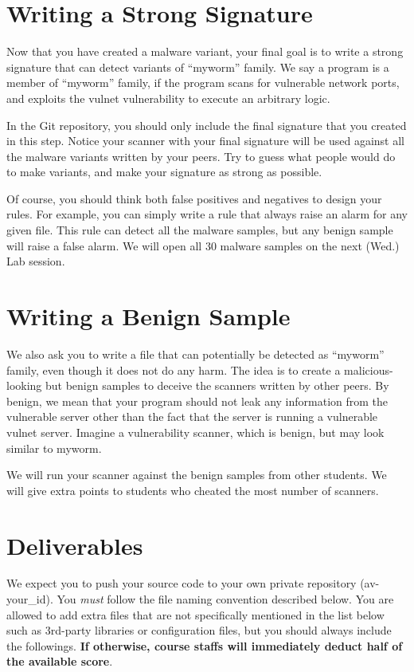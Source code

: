 \documentclass[a4paper, 11pt]{article}
\theoremstyle{definition}
\begin{document}
{\section{Writing a Strong Signature}

Now that you have created a malware variant, your final goal is to
write a strong signature that can detect variants of ``myworm''
family. We say a program is a member of ``myworm'' family, if the
program scans for vulnerable network ports, and exploits the vulnet
vulnerability to execute an arbitrary logic.

In the Git repository, you should only include the final signature
that you created in this step. Notice your scanner with your final
signature will be used against all the malware variants written by
your peers. Try to guess what people would do to make variants, and
make your signature as strong as possible.

Of course, you should think both false positives and negatives to
design your rules. For example, you can simply write a rule that
always raise an alarm for any given file. This rule can detect all the
malware samples, but any benign sample will raise a false alarm. We
will open all 30 malware samples on the next (Wed.) Lab session.

\section{Writing a Benign Sample}

We also ask you to write a file that can potentially be detected as
``myworm'' family, even though it does not do any harm. The idea is to
create a malicious-looking but benign samples to deceive the scanners
written by other peers. By benign, we mean that your program should
not leak any information from the vulnerable server other than the
fact that the server is running a vulnerable vulnet server. Imagine a
vulnerability scanner, which is benign, but may look similar to
myworm.

We will run your scanner against the benign samples from other
students. We will give extra points to students who cheated the most
number of scanners.

\section{Deliverables}

We expect you to push your source code to your own private repository
(av-your\_id). You \emph{must} follow the file naming convention
described below. You are allowed to add extra files that are not
specifically mentioned in the list below such as 3rd-party libraries
or configuration files, but you should always include the followings.
\textbf{If otherwise, course staffs will immediately deduct half of
the available score}.

}
\end{document}
